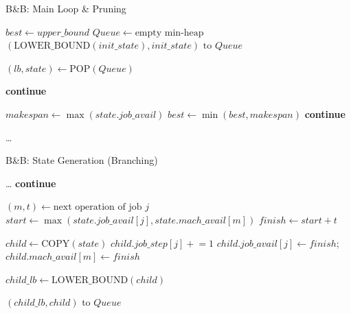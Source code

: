 \documentclass{beamer}
\begin{document}
\begin{frame}{B\&B: Main Loop \& Pruning}
    \scriptsize
    \begin{algorithmic}[1]
            \State $best \leftarrow upper\_bound$
            \State $Queue \leftarrow \text{empty min-heap}$
            \State {} $(\text{LOWER\_BOUND}(init\_state), init\_state) \text{ to } Queue$
            
                \State $(lb, state) \leftarrow \text{POP}(Queue)$
                
                    \State \textbf{continue} 
                \EndIf
                
                    \State $makespan \leftarrow \max(state.job\_avail)$
                    \State $best \leftarrow \min(best, makespan)$
                    \State \textbf{continue}
                \EndIf
                
                \State \dots {}
            \EndWhile
        \EndFunction
    \end{algorithmic}
\end{frame}

\begin{frame}{B\&B: State Generation (Branching)}
    \scriptsize 
    \begin{algorithmic}[1]
        \State \dots {}
             \textbf{continue} \EndIf
            
            \State $(m, t) \leftarrow \text{next operation of job } j$
            \State $start \leftarrow \max(state.job\_avail[j], state.mach\_avail[m])$
            \State $finish \leftarrow start + t$
            
            \State $child \leftarrow \text{COPY}(state)$
            \State $child.job\_step[j] \mathrel{+}= 1$
            \State $child.job\_avail[j] \leftarrow finish$; \quad $child.mach\_avail[m] \leftarrow finish$
            
            \State $child\_lb \leftarrow \text{LOWER\_BOUND}(child)$
            
                \State {} $(child\_lb, child) \text{ to } Queue$
            \EndIf
        \EndFor
    \end{algorithmic}
\end{frame}
\end{document}

